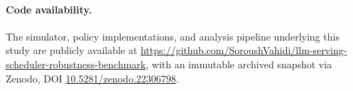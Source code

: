 \paragraph{Code availability.} The simulator, policy implementations, and
analysis pipeline underlying this study are publicly available at
\url{https://github.com/SoroushVahidi/llm-serving-scheduler-robustness-benchmark},
with an immutable archived snapshot via Zenodo, DOI
\href{https://doi.org/10.5281/zenodo.22306798}{10.5281/zenodo.22306798}.
